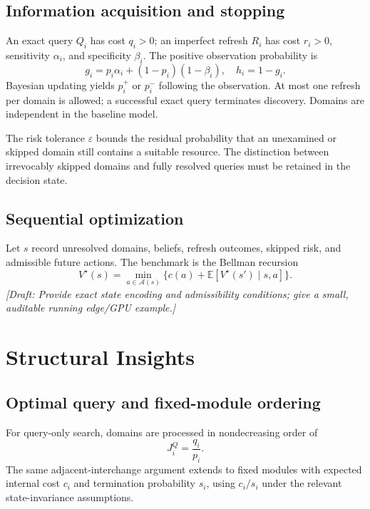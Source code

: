\documentclass[conference]{IEEEtran}
\newcommand{\TODO}[1]{\textit{[Draft: #1]}}
\begin{document}
\subsection{Information acquisition and stopping}
An exact query $Q_i$ has cost $q_i>0$; an imperfect refresh $R_i$
has cost $r_i>0$, sensitivity $\alpha_i$, and specificity $\beta_i$.
The positive observation probability is
\begin{equation}
 g_i=p_i\alpha_i+(1-p_i)(1-\beta_i),\quad h_i=1-g_i.
\end{equation}
Bayesian updating yields $p_i^+$ or $p_i^-$ following the observation.
At most one refresh per domain is allowed; a successful exact query
terminates discovery. Domains are independent in the baseline model.

The risk tolerance $\varepsilon$ bounds the residual probability that
an unexamined or skipped domain still contains a suitable resource.
The distinction between irrevocably skipped domains and fully
resolved queries must be retained in the decision state.

\subsection{Sequential optimization}
Let $s$ record unresolved domains, beliefs, refresh outcomes, skipped
risk, and admissible future actions. The benchmark is the Bellman
recursion
\begin{equation}
 V^\star(s)=\min_{a\in\mathcal A(s)}
 \bigl\{c(a)+\mathbb E[V^\star(s')\mid s,a]\bigr\}.
 \label{eq:bellman}
\end{equation}
\TODO{Provide exact state encoding and admissibility conditions; give a
small, auditable running edge/GPU example.}

\section{Structural Insights}
\label{sec:structural}
\subsection{Optimal query and fixed-module ordering}
For query-only search, domains are processed in nondecreasing order of
\begin{equation}
 J_i^Q=\frac{q_i}{p_i}.
\end{equation}
The same adjacent-interchange argument extends to fixed modules with
expected internal cost $c_i$ and termination probability $s_i$, using
$c_i/s_i$ under the relevant state-invariance assumptions.
\end{document}
